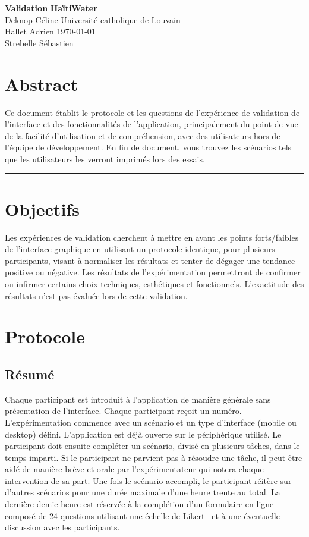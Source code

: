 \documentclass[a4paper, 11pt]{article}
\begin{document}
\noindent
\large\textbf{Validation} \hfill \textbf{HaïtiWater} \\
\normalsize Deknop Céline \hfill Université catholique de Louvain \\
Hallet Adrien \hfill \today \\
Strebelle Sébastien

\section*{Abstract}
    Ce document établit le protocole et les questions de l'expérience de validation de l'interface et des fonctionnalités de l'application, principalement du point de vue de la facilité d'utilisation et de compréhension, avec des utilisateurs hors de l'équipe de développement. En fin de document, vous trouvez les scénarios tels que les utilisateurs les verront imprimés lors des essais.
\hrule

\section{Objectifs}
    Les expériences de validation cherchent à mettre en avant les points forts/faibles de l'interface graphique en utilisant un protocole identique, pour plusieurs participants, visant à normaliser les résultats et tenter de dégager une tendance positive ou négative. Les résultats de l'expérimentation permettront de confirmer ou infirmer certains choix techniques, esthétiques et fonctionnels. L'exactitude des résultats n'est pas évaluée lors de cette validation.

\section{Protocole}
    \subsection*{Résumé}
        Chaque participant est introduit à l'application de manière générale sans présentation de l'interface. Chaque participant reçoit un numéro. L'expérimentation commence avec un scénario et un type d'interface (mobile ou desktop) défini. L'application est déjà ouverte sur le périphérique utilisé. Le participant doit ensuite compléter un scénario, divisé en plusieurs tâches, dans le temps imparti. Si le participant ne parvient pas à résoudre une tâche, il peut être aidé de manière brève et orale par l'expérimentateur qui notera chaque intervention de sa part. Une fois le scénario accompli, le participant réitère sur d'autres scénarios pour une durée maximale d'une heure trente au total. La dernière demie-heure est réservée à la complétion d'un formulaire en ligne composé de 24 questions utilisant une échelle de Likert~\cite{wikipediaLikertScale} et à une éventuelle discussion avec les participants.
\end{document}
